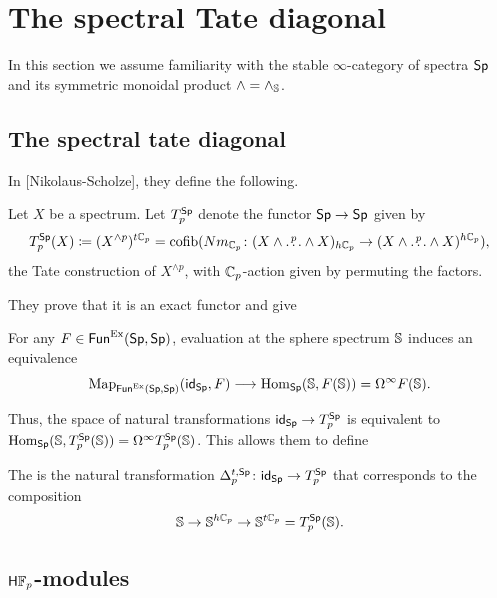 
\section{The spectral Tate diagonal}

In this section we assume familiarity with the stable \(\infty\)-category of spectra \(\mathsf{Sp}\) and its symmetric monoidal product \(\wedge=\wedge_{\mathbb{S}}\).

\subsection{The spectral tate diagonal}

In [Nikolaus-Scholze], they define the following.

\begin{definition}
	Let \(X\) be a spectrum.
	Let \(T^{\mathsf{Sp}}_p\) denote the functor \(\mathsf{Sp} \to \mathsf{Sp}\) given by
	\[
	T^{\mathsf{Sp}}_p(X) \coloneqq (X^{\wedge p})^{t\mathbb{C}_p} = \operatorname{cofib}(Nm_{\mathbb{C}_p} \colon (X \wedge \overset{p}{\dots} \wedge X)_{h\mathbb{C}_p} \to (X \wedge \overset{p}{\dots} \wedge X)^{h\mathbb{C}_p}),
	\]
	the Tate construction of \(X^{\wedge p}\), with \(\mathbb{C}_p\)-action given by permuting the factors.
\end{definition}

They prove that it is an exact functor and give

\begin{proposition}
	For any \(F \in \mathsf{Fun}^{\mathrm{Ex}}(\mathsf{Sp},\mathsf{Sp})\), evaluation at the sphere spectrum \(\mathbb{S}\) induces an equivalence
	\[
	\mathrm{Map}_{\mathsf{Fun}^{\mathrm{Ex}}(\mathsf{Sp},\mathsf{Sp})}(\mathsf{id}_{\mathsf{Sp}},F) \longrightarrow \mathrm{Hom}_{\mathsf{Sp}}(\mathbb{S},F(\mathbb{S})) = \Omega^\infty F(\mathbb{S}).
	\]
\end{proposition}

Thus, the space of natural transformations \(\mathsf{id}_{\mathsf{Sp}} \to T_p^{\mathsf{Sp}}\) is equivalent to \(\mathrm{Hom}_{\mathsf{Sp}}(\mathbb{S},T_p^{\mathsf{Sp}}(\mathbb{S})) = \Omega^\infty T^{\mathsf{Sp}}_p(\mathbb{S})\).
This allows them to define

\begin{definition}\label{dspectraltate}
	The  is the natural transformation \(\Delta_p^{t,\mathsf{Sp}} \colon \mathsf{id}_{\mathsf{Sp}} \to T_p^{\mathsf{Sp}}\) that corresponds to the composition
	\[
	\mathbb{S} \to \mathbb{S}^{h\mathbb{C}_p} \to \mathbb{S}^{t\mathbb{C}_p} = T_p^{\mathsf{Sp}}(\mathbb{S}).
	\]
\end{definition}


\subsection{\(\mathsf{H}{\mathbb{F}_p}\)-modules}\label{HFpmod}

